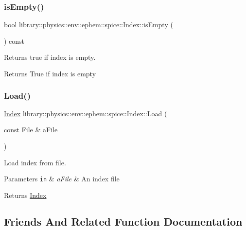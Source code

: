 \subsubsection{\texorpdfstring{is\+Empty()}{isEmpty()}}
{\footnotesize\ttfamily bool library\+::physics\+::env\+::ephem\+::spice\+::\+Index\+::is\+Empty (\begin{DoxyParamCaption}{ }\end{DoxyParamCaption}) const}



Returns true if index is empty. 

\begin{DoxyReturn}{Returns}
True if index is empty 
\end{DoxyReturn}
\mbox{\label{classlibrary_1_1physics_1_1env_1_1ephem_1_1spice_1_1_index_af7a290a388b985c9dc621512085e400a}} 
\subsubsection{\texorpdfstring{Load()}{Load()}}
{\footnotesize\ttfamily \hyperlink{classlibrary_1_1physics_1_1env_1_1ephem_1_1spice_1_1_index}{Index} library\+::physics\+::env\+::ephem\+::spice\+::\+Index\+::\+Load (\begin{DoxyParamCaption}\item[{const File \&}]{a\+File }\end{DoxyParamCaption})\hspace{0.3cm}{\ttfamily [static]}}



Load index from file. 


\begin{DoxyParams}[1]{Parameters}
\mbox{\tt in}  & {\em a\+File} & An index file \\
\hline
\end{DoxyParams}
\begin{DoxyReturn}{Returns}
\hyperlink{classlibrary_1_1physics_1_1env_1_1ephem_1_1spice_1_1_index}{Index} 
\end{DoxyReturn}


\subsection{Friends And Related Function Documentation}
\mbox{\label{classlibrary_1_1physics_1_1env_1_1ephem_1_1spice_1_1_index_a1cdcc2b37f330da2f47a459f6225e98d}} 
